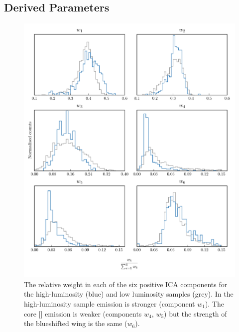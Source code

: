 \subsection{Derived Parameters}

\begin{figure}
    \includegraphics[width=\textwidth]{figures/chapter04/mfica_component_weights.pdf} 
    \caption{The relative weight in each of the six positive ICA components for the high-luminosity (blue) and low luminosity samples (grey). In the high-luminosity sample  emission is stronger (component $w_1$). The core [] emission is weaker (components $w_4$, $w_5$) but the strength of the blueshifted wing is the same ($w_6$).}     
    \label{fig:mfica_component_weights}
\end{figure}

